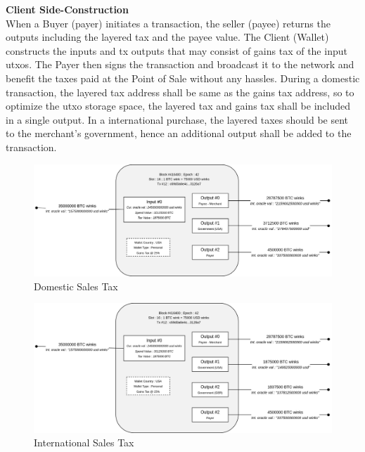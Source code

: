 \documentclass[letterpaper,11pt]{article}
\begin{document}
\textbf{Client Side-Construction}\\

When a Buyer (payer) initiates a transaction, the seller (payee) returns the outputs including the layered tax and the payee value. The Client (Wallet) constructs the inputs and tx outputs that may consist of gains tax of the input utxos. The Payer then signs the transaction and broadcast it to the network and benefit the taxes paid at the Point of Sale without any hassles. During a domestic transaction, the layered tax address shall be same as the gains tax address, so to optimize the utxo storage space, the layered tax and gains tax shall be included in a single output. In a international purchase, the layered taxes should be sent to the merchant's government, hence an additional output shall be added to the transaction.\\

\begin{figure}
\begin{center}
\includegraphics[width=\textwidth]{layeredtaxdmst}
\caption{Domestic Sales Tax}
\end{center}
\end{figure}

\begin{figure}
\begin{center}
\includegraphics[width=\textwidth]{layeredtaxint}
\caption{International Sales Tax}
\end{center}
\end{figure}
\end{document}
